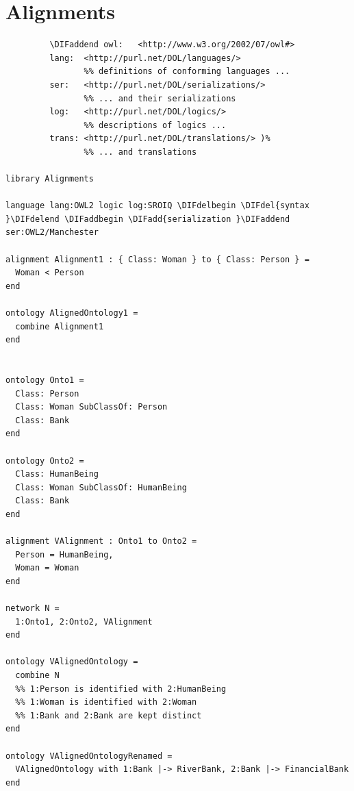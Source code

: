 \documentclass[10pt,fleqn,final]{scrreprt}
\newcommand{\sclause}[1]{\section{#1}}
\newcommand{\ssclause}[1]{\subsection{#1}}
\providecommand{\DIFadd}[1]{{\protect\color{blue}\uwave{#1}}} %
\providecommand{\DIFdel}[1]{{\protect\color{red}\sout{#1}}}                      %
\providecommand{\DIFaddbegin}{} %
\providecommand{\DIFaddend}{} %
\providecommand{\DIFdelbegin}{} %
\providecommand{\DIFdelend}{} %
\begin{document}
\DIFdelbegin %
\DIFdelend \DIFaddbegin \sclause{Alignments}\label{ex:alignment}
\DIFaddend {}
\DIFdelbegin %
         \DIFdelend \DIFaddbegin \begin{lstlisting}[basicstyle=\ttfamily,language=dolText,alsolanguage=OWL2manchester,escapechar=@,mathescape]
%DIF > prefix( :      <http://www.example.org/@alignment@#>
         \DIFaddend owl:   <http://www.w3.org/2002/07/owl#>
         lang:  <http://purl.net/DOL/languages/>
                %% definitions of conforming languages ...
         ser:   <http://purl.net/DOL/serializations/>
                %% ... and their serializations
         log:   <http://purl.net/DOL/logics/>
                %% descriptions of logics ...
         trans: <http://purl.net/DOL/translations/> )%
                %% ... and translations

library Alignments

language lang:OWL2 logic log:SROIQ \DIFdelbegin \DIFdel{syntax }\DIFdelend \DIFaddbegin \DIFadd{serialization }\DIFaddend ser:OWL2/Manchester

alignment Alignment1 : { Class: Woman } to { Class: Person } =
  Woman < Person
end

ontology AlignedOntology1 =
  combine Alignment1
end


ontology Onto1 =
  Class: Person
  Class: Woman SubClassOf: Person
  Class: Bank
end

ontology Onto2 =
  Class: HumanBeing
  Class: Woman SubClassOf: HumanBeing
  Class: Bank
end

alignment VAlignment : Onto1 to Onto2 =
  Person = HumanBeing,
  Woman = Woman
end

network N =
  1:Onto1, 2:Onto2, VAlignment
end

ontology VAlignedOntology =
  combine N
  %% 1:Person is identified with 2:HumanBeing
  %% 1:Woman is identified with 2:Woman
  %% 1:Bank and 2:Bank are kept distinct
end

ontology VAlignedOntologyRenamed =
  VAlignedOntology with 1:Bank |-> RiverBank, 2:Bank |-> FinancialBank
end

\end{lstlisting}
\end{document}
